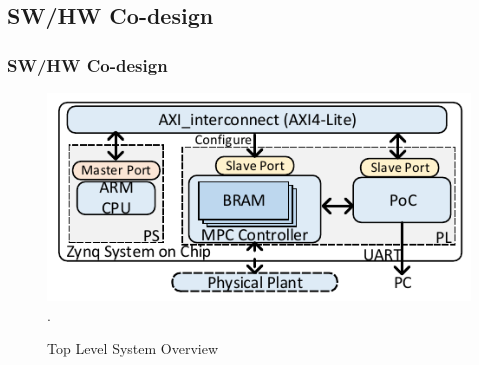 \documentclass{beamer}
\begin{document}
\subsection{SW/HW Co-design}
\begin{frame}
\frametitle{SW/HW Co-design}
\begin{figure}[t]
\centering
\captionsetup{justification=centering}
\includegraphics[scale=.84]{../ASAP_17/figure/copro.pdf}
\DeclareGraphicsExtensions.
\caption{Top Level System Overview\label{fig_copro}}
\end{figure}

\end{frame}
\end{document}
